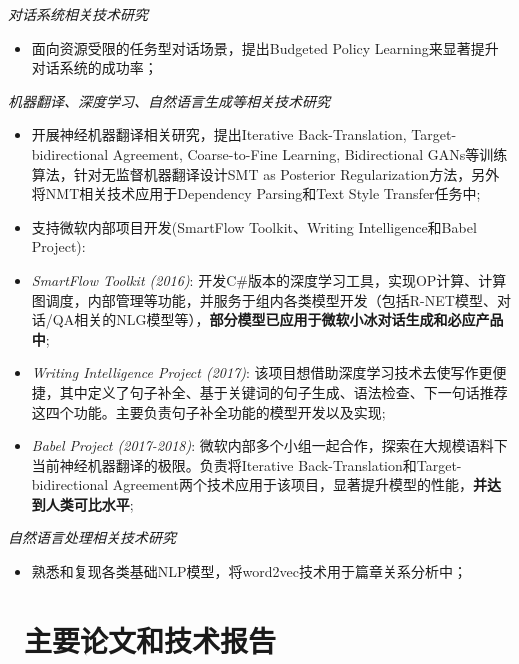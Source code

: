 \documentclass{resume}
\begin{document}
\textit{对话系统相关技术研究}
\begin{itemize}
  \item 面向资源受限的任务型对话场景，提出Budgeted Policy Learning来显著提升对话系统的成功率；
\end{itemize}

\textit{机器翻译、深度学习、自然语言生成等相关技术研究}
\begin{itemize}
  \item 开展神经机器翻译相关研究，提出Iterative Back-Translation, Target-bidirectional Agreement, Coarse-to-Fine Learning, Bidirectional GANs等训练算法，针对无监督机器翻译设计SMT as Posterior Regularization方法，另外将NMT相关技术应用于Dependency Parsing和Text Style Transfer任务中;
  \item 支持微软内部项目开发(SmartFlow Toolkit、Writing Intelligence和Babel Project):
  \item[-] \emph{SmartFlow Toolkit (2016)}:  开发C\#版本的深度学习工具，实现OP计算、计算图调度，内部管理等功能，并服务于组内各类模型开发（包括R-NET模型、对话/QA相关的NLG模型等），\textbf{部分模型已应用于微软小冰对话生成和必应产品中};
  \item[-] \emph{Writing Intelligence Project (2017)}: 该项目想借助深度学习技术去使写作更便捷，其中定义了句子补全、基于关键词的句子生成、语法检查、下一句话推荐这四个功能。主要负责句子补全功能的模型开发以及实现;
  \item[-] \emph{Babel Project (2017-2018)}: 微软内部多个小组一起合作，探索在大规模语料下当前神经机器翻译的极限。负责将Iterative Back-Translation和Target-bidirectional Agreement两个技术应用于该项目，显著提升模型的性能，\textbf{并达到人类可比水平};
\end{itemize}

\textit{自然语言处理相关技术研究}
\begin{itemize}
  \item 熟悉和复现各类基础NLP模型，将word2vec技术用于篇章关系分析中；
\end{itemize}

\section{\faFilesO\ 主要论文和技术报告}
\end{document}
